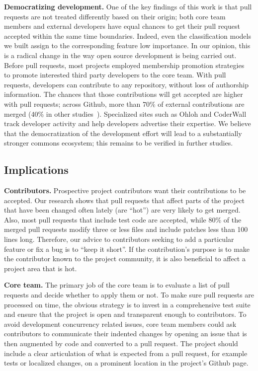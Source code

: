 \documentclass{sig-alternate}
\begin{document}
%
\textbf{Democratizing development.} One of the key findings of this work is
that pull requests are not treated differently based on their origin; both core
team members and external developers have equal chances to get their pull
request accepted within the same time boundaries. Indeed, even the
classification models we built assign to the corresponding feature low
importance. In our opinion, this is a radical change in the way open source
development is being carried out. Before pull requests, most projects employed
membership promotion strategies~\cite{Jense07} to promote interested third party
developers to the core team. With pull requests, developers can contribute to
any repository, without loss of authorship information. The chances that those
contributions will get accepted are higher with pull requests; across Github, more than 70\% of external contributions are merged
(40\% in other studies~\cite{Rigby06, Weiss08}). Specialized sites such as
Ohloh and CoderWall track developer activity and help developers advertise their
expertise. We believe that the democratization of the development effort will
lead to a substantially stronger commons ecosystem; this remains to be
verified in further studies.

\subsection{Implications}

\textbf{Contributors.} Prospective project contributors want their
contributions to be accepted. Our research shows that pull requests that affect
parts of the project that  have been changed often lately (are ``hot'') are very
likely to get merged. Also, most pull requests that include test code are
accepted, while 80\% of the merged pull requests modify three or less files and
include patches less than 100 lines long. Therefore, our advice to contributors
seeking to add a particular feature or fix a bug is to ``keep it short''. If the
contribution's purpose is to make the contributor known to the project
community, it is also beneficial to affect a project area that is hot.

\textbf{Core team.} The primary job of the core team is to evaluate a list of
pull requests and decide whether to apply them or not. To make sure pull
requests are processed on time, the obvious strategy is to invest in a
comprehensive test suite and ensure that the project is open and transparent
enough to contributors. To avoid development concurrency related issues, core
team members could ask contributors to communicate their indented changes by
opening an issue that is then augmented by code and converted to a pull
request. The project should include a clear articulation of what is expected
from a pull request, for example tests or localized changes, on a prominent
location in the project's Github page.
\end{document}
